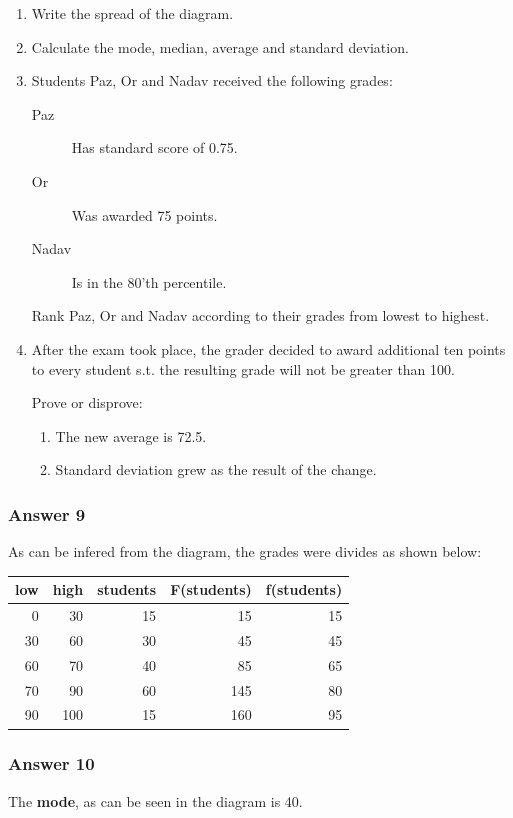 \documentclass[11pt]{article}
\begin{document}
\begin{enumerate}
\item Write the spread of the diagram.
\item Calculate the mode, median, average and standard deviation.
\item Students Paz, Or and Nadav received the following grades:
\begin{description}
\item[{Paz}] Has standard score of 0.75.
\item[{Or}] Was awarded 75 points.
\item[{Nadav}] Is in the 80'th percentile.
\end{description}
Rank Paz, Or and Nadav according to their grades from 
lowest to highest.
\item After the exam took place, the grader decided to award additional
ten points to every student s.t. the resulting grade will not be greater
than 100.

Prove or disprove:
\begin{enumerate}
\item The new average is 72.5.
\item Standard deviation grew as the result of the change.
\end{enumerate}
\end{enumerate}

\subsubsection{Answer 9}
\label{sec-1-3-1}
As can be infered from the diagram, the grades were divides as shown below:

\begin{center}
\begin{tabular}{rrrrr}
low & high & students & F(students) & f(students)\\
\hline
0 & 30 & 15 & 15 & 15\\
30 & 60 & 30 & 45 & 45\\
60 & 70 & 40 & 85 & 65\\
70 & 90 & 60 & 145 & 80\\
90 & 100 & 15 & 160 & 95\\
\end{tabular}
\end{center}
\subsubsection{Answer 10}
\label{sec-1-3-2}
The \textbf{mode}, as can be seen in the diagram is 40.
\end{document}
